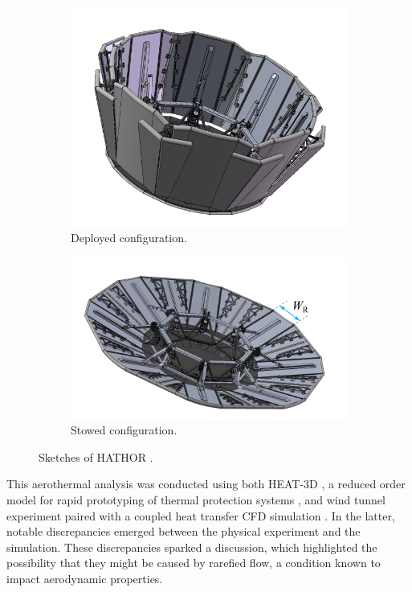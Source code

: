 \begin{figure}[ht]
    \centering
    \begin{subfigure}{0.43\textwidth}
        \centering
        \includegraphics[width=\textwidth]{../Images/1. Introduction/HathorStowed.png}
        \caption{Deployed configuration.}
    \end{subfigure}
    \hfill
    \begin{subfigure}{0.56\textwidth}
        \centering
        \includegraphics[width=\textwidth]{../Images/1. Introduction/HathorDeployed.png}  
        \caption{Stowed configuration.}
    \end{subfigure}
    \caption{Sketches of HATHOR \cite{hathoraero1}.}
    \label{fig:hathorsketch}
\end{figure}

This aerothermal analysis was conducted using both HEAT-3D \cite{heat3d}, a reduced order model for rapid prototyping of thermal protection systems \cite{hathoraero1}, and wind tunnel experiment paired with a coupled heat transfer CFD simulation \cite{hathoraero2}. 
In the latter, notable discrepancies emerged between the physical experiment and the simulation. These discrepancies sparked a discussion, which highlighted the possibility that they might be caused by rarefied flow, a condition known to impact aerodynamic properties. 

